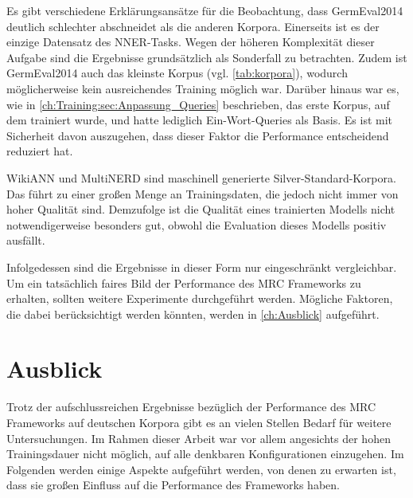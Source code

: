 Es gibt verschiedene Erklärungsansätze für die Beobachtung, dass GermEval2014 deutlich schlechter abschneidet als die anderen Korpora. Einerseits ist es der einzige Datensatz des NNER-Tasks. Wegen der höheren Komplexität dieser Aufgabe sind die Ergebnisse grundsätzlich als Sonderfall zu betrachten. Zudem ist GermEval2014 auch das kleinste Korpus (vgl. \autoref{tab:korpora}), wodurch möglicherweise kein ausreichendes Training möglich war. Darüber hinaus war es, wie in \autoref{ch:Training:sec:Anpassung_Queries} beschrieben, das erste Korpus, auf dem trainiert wurde, und hatte lediglich Ein-Wort-Queries als Basis. Es ist mit Sicherheit davon auszugehen, dass dieser Faktor die Performance entscheidend reduziert hat.

WikiANN und MultiNERD sind maschinell generierte Silver-Standard-Korpora. Das führt zu einer großen Menge an Trainingsdaten, die jedoch nicht immer von hoher Qualität sind. Demzufolge ist die Qualität eines trainierten Modells nicht notwendigerweise besonders gut, obwohl die Evaluation dieses Modells positiv ausfällt.

Infolgedessen sind die Ergebnisse in dieser Form nur eingeschränkt vergleichbar. Um ein tatsächlich faires Bild der Performance des MRC Frameworks zu erhalten, sollten weitere Experimente durchgeführt werden. Mögliche Faktoren, die dabei berücksichtigt werden könnten, werden in \autoref{ch:Ausblick} aufgeführt.

\chapter{Ausblick}
\label{ch:Ausblick}

Trotz der aufschlussreichen Ergebnisse bezüglich der Performance des MRC Frameworks auf deutschen Korpora gibt es an vielen Stellen Bedarf für weitere Untersuchungen. Im Rahmen dieser Arbeit war vor allem angesichts der hohen Trainingsdauer nicht möglich, auf alle denkbaren Konfigurationen einzugehen. Im Folgenden werden einige Aspekte aufgeführt werden, von denen zu erwarten ist, dass sie großen Einfluss auf die Performance des Frameworks haben.

